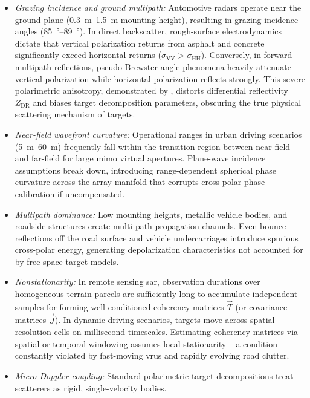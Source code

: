 \begin{itemize}
    \item \emph{Grazing incidence and ground multipath:} Automotive radars operate near the ground plane (\qtyrange{0.3}{1.5}{m} mounting height), resulting in grazing incidence angles (\qtyrange[range-units=repeat]{85}{89}{\degree}).
    In direct backscatter, rough-surface electrodynamics dictate that vertical polarization returns from asphalt and concrete significantly exceed horizontal returns ($\sigma_{\mathrm{VV}} > \sigma_{\mathrm{HH}}$).
    Conversely, in forward multipath reflections, pseudo-Brewster angle phenomena heavily attenuate vertical polarization while horizontal polarization reflects strongly.
    This severe polarimetric anisotropy, demonstrated by \textcite{visentinPolarimetricRadarAutomotive2019,bouwmeesterRoadSurfaceConditions2023}, distorts differential reflectivity $Z_{\mathrm{DR}}$ and biases target decomposition parameters, obscuring the true physical scattering mechanism of targets.
    \item \emph{Near-field wavefront curvature:} Operational ranges in urban driving scenarios (\qtyrange{5}{60}{m}) frequently fall within the transition region between near-field and far-field for large \gls{mimo} virtual apertures.
    Plane-wave incidence assumptions break down, introducing range-dependent spherical phase curvature across the array manifold that corrupts cross-polar phase calibration if uncompensated.
    \item \emph{Multipath dominance:} Low mounting heights, metallic vehicle bodies, and roadside structures create multi-path propagation channels.
    Even-bounce reflections off the road surface and vehicle undercarriages introduce spurious cross-polar energy, generating depolarization characteristics not accounted for by free-space target models.
    \item \emph{Nonstationarity:} In remote sensing \gls{sar}, observation durations over homogeneous terrain parcels are sufficiently long to accumulate independent samples for forming well-conditioned coherency matrices $\vec T$ (or covariance matrices $\vec J$).
    In dynamic driving scenarios, targets move across spatial resolution cells on millisecond timescales.
    Estimating coherency matrices via spatial or temporal windowing assumes local stationarity -- a condition constantly violated by fast-moving \glspl{vru} and rapidly evolving road clutter.
    \item \emph{Micro-Doppler coupling:} Standard polarimetric target decompositions treat scatterers as rigid, single-velocity bodies.

\end{itemize}
